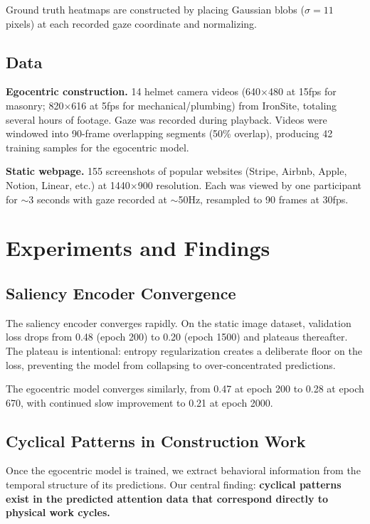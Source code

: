 \documentclass{article}
\begin{document}
Ground truth heatmaps are constructed by placing Gaussian blobs ($\sigma = 11$ pixels) at each recorded gaze coordinate and normalizing.

\subsection{Data}

\textbf{Egocentric construction.} 14 helmet camera videos (640$\times$480 at 15fps for masonry; 820$\times$616 at 5fps for mechanical/plumbing) from IronSite, totaling several hours of footage. Gaze was recorded during playback. Videos were windowed into 90-frame overlapping segments (50\% overlap), producing 42 training samples for the egocentric model.

\textbf{Static webpage.} 155 screenshots of popular websites (Stripe, Airbnb, Apple, Notion, Linear, etc.) at 1440$\times$900 resolution. Each was viewed by one participant for $\sim$3 seconds with gaze recorded at $\sim$50Hz, resampled to 90 frames at 30fps.

\section{Experiments and Findings}

\subsection{Saliency Encoder Convergence}

The saliency encoder converges rapidly. On the static image dataset, validation loss drops from 0.48 (epoch 200) to 0.20 (epoch 1500) and plateaus thereafter. The plateau is intentional: entropy regularization creates a deliberate floor on the loss, preventing the model from collapsing to over-concentrated predictions.

The egocentric model converges similarly, from 0.47 at epoch 200 to 0.28 at epoch 670, with continued slow improvement to 0.21 at epoch 2000.

\subsection{Cyclical Patterns in Construction Work}

Once the egocentric model is trained, we extract behavioral information from the temporal structure of its predictions. Our central finding: \textbf{cyclical patterns exist in the predicted attention data that correspond directly to physical work cycles.}
\end{document}
